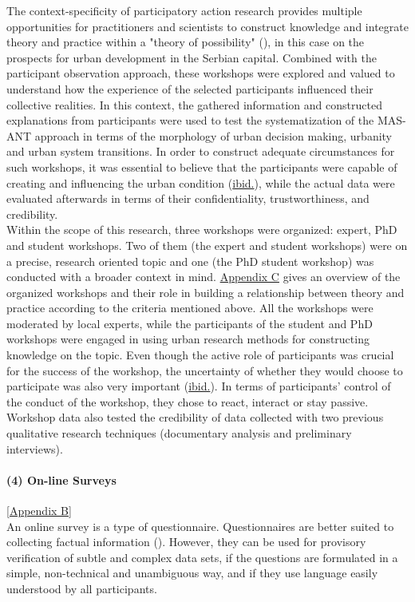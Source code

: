 \documentclass[11pt]{report}
\begin{document}
{{{{The context-specificity of participatory action research provides multiple opportunities for practitioners and scientists to construct knowledge and integrate theory  and  practice within a "theory of possibility" (\href{Mc}{\citealt{whyte_participatory_1991}}), in this case on the prospects for urban development in the Serbian capital. Combined with the participant observation approach, these workshops were explored and valued to understand how the experience of the selected participants influenced their collective realities. In this context, the gathered information and constructed explanations from participants were used to test the systematization of the MAS-ANT approach in terms of the morphology of urban decision making, urbanity and urban system transitions. In order to construct adequate circumstances for such workshops, it was essential to believe that the participants were capable of creating and influencing the urban condition (\href{Mc}{ibid.}), while the actual data were evaluated afterwards in terms of their confidentiality, trustworthiness, and credibility.
\\

Within the scope of this research, three workshops were organized: expert, PhD and student workshops. Two of them (the expert and student workshops) were on a precise, research oriented topic and one (the PhD student workshop) was conducted with a broader context in mind.
\href{Appendix C}{Appendix C} gives an overview of the organized workshops and their role in building a relationship between theory and practice according to the criteria mentioned above. All the workshops were moderated by local experts, while the participants of the student and PhD workshops were engaged in using urban research methods for constructing knowledge on the topic. Even though the active role of participants was crucial for the success of the workshop, the uncertainty of whether they would choose to participate was also very important (\href{Mc}{ibid.}).
In terms of participants’ control of the conduct of the workshop, they chose to react, interact or stay passive. Workshop data also tested the credibility of data collected with two previous qualitative research techniques (documentary analysis and preliminary interviews).

\paragraph{(4) On-line Surveys}
[\href{ref}{Appendix B}]
\\
An online survey is a type of questionnaire. Questionnaires are better suited to collecting factual information (\href{Payne}{\citealt{payne_key_2004}}). However, they can be used for provisory verification of subtle and complex data sets, if the questions are formulated in a simple, non-technical and unambiguous way, and if they use  language easily understood by all participants.
\\

}}}}
\end{document}
